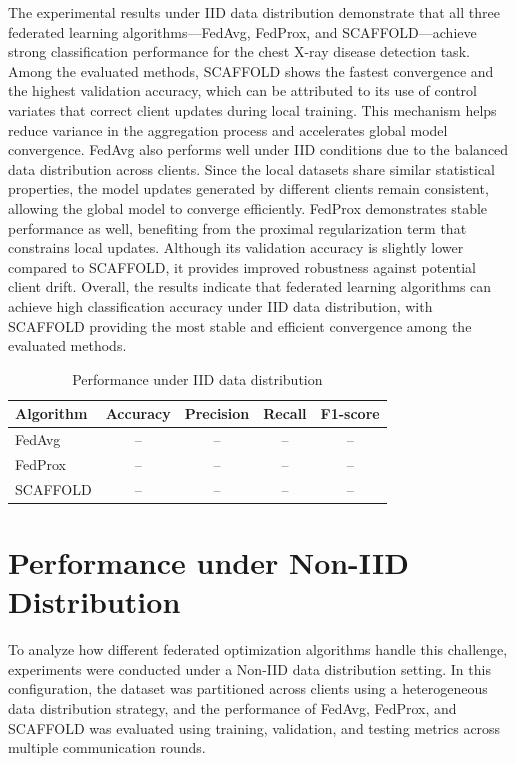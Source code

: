 \documentclass[12pt]{book}
\begin{document}
The experimental results under IID data distribution demonstrate that all three federated learning algorithms—FedAvg, FedProx, and SCAFFOLD—achieve strong classification performance for the chest X-ray disease detection task.
Among the evaluated methods, SCAFFOLD shows the fastest convergence and the highest validation accuracy, which can be attributed to its use of control variates that correct client updates during local training. This mechanism helps reduce variance in the aggregation process and accelerates global model convergence.
FedAvg also performs well under IID conditions due to the balanced data distribution across clients. Since the local datasets share similar statistical properties, the model updates generated by different clients remain consistent, allowing the global model to converge efficiently.
FedProx demonstrates stable performance as well, benefiting from the proximal regularization term that constrains local updates. Although its validation accuracy is slightly lower compared to SCAFFOLD, it provides improved robustness against potential client drift.
Overall, the results indicate that federated learning algorithms can achieve high classification accuracy under IID data distribution, with SCAFFOLD providing the most stable and efficient convergence among the evaluated methods.


\begin{table}[H]
\centering
\caption{Performance under IID data distribution}
\label{tab:iid_results}
\begin{tabular}{lcccc}
\toprule
Algorithm & Accuracy & Precision & Recall & F1-score \\
\midrule
FedAvg & -- & -- & -- & -- \\
FedProx & -- & -- & -- & -- \\
SCAFFOLD & -- & -- & -- & -- \\
\bottomrule
\end{tabular}
\end{table}



\section{Performance under Non-IID Distribution}


To analyze how different federated optimization algorithms handle this challenge, experiments were conducted under a Non-IID data distribution setting. In this configuration, the dataset was partitioned across clients using a heterogeneous data distribution strategy, and the performance of FedAvg, FedProx, and SCAFFOLD was evaluated using training, validation, and testing metrics across multiple communication rounds.
\end{document}
